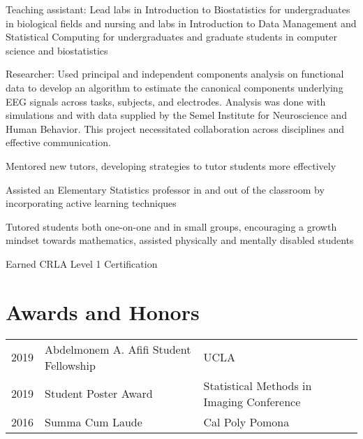\documentclass[]{deedy-resume-openfont}
\begin{document}
\vspace{-.25em}
\begin{tightemize}
\item Teaching assistant: Lead labs in Introduction to Biostatistics for undergraduates in biological fields and nursing and labs in Introduction to Data Management and Statistical Computing for undergraduates and graduate students in computer science and biostatistics 
\item Researcher: Used principal and independent components analysis on functional data to develop an algorithm to estimate the canonical components underlying EEG signals across tasks, subjects, and electrodes. Analysis was done with simulations and with data supplied by the Semel Institute for Neuroscience and Human Behavior. This project necessitated collaboration across disciplines and effective communication. 
\end{tightemize}
\sectionsep

\vspace{-.25em}
\begin{tightemize}
\item Mentored new tutors, developing strategies to tutor students more effectively
\item Assisted an Elementary Statistics professor in and out of the classroom by incorporating active learning techniques
\item Tutored students both one-on-one and in small groups, encouraging a growth mindset towards mathematics, assisted physically and mentally disabled students
\item Earned CRLA Level 1 Certification
\end{tightemize}
\sectionsep

\section{Awards and Honors} 
\begin{tabular}{rll}
2019 & Abdelmonem A. Afifi Student Fellowship & UCLA \\
2019 & Student Poster Award                   & Statistical Methods in Imaging Conference \\ 
2016 & Summa Cum Laude                        & Cal Poly Pomona \\ 
\end{tabular}
\sectionsep
\end{document}
